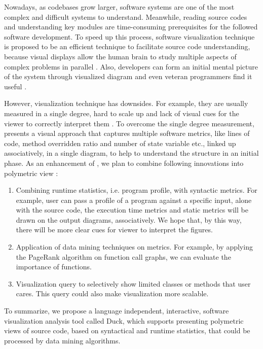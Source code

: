 \documentclass{sig-alternate}
\begin{document}
Nowadays, as codebases grow larger, software systems are one of the most complex and difficult systems to understand.
Meanwhile, reading source codes and understanding key modules are time-consuming prerequisites for the followed software development.
To speed up this process, software visualization technique is proposed to be an efficient technique
to facilitate source code understanding, because visual displays allow the human brain to study
multiple aspects of complex problems in parallel \cite{petre1995looking}.
Also, developers can form an initial mental picture of the system through visualized diagram \cite{lanza2003object}
and even veteran programmers find it useful \cite{kim2012field}. 

However, visualization technique has downsides.
For example, they are usually measured in a single degree,
hard to scale up and lack of visual cues for the viewer to correctly interpret them \cite{fenton2014software}.
To overcome the single degree measurement, \cite{lanza2003polymetric} presents a visual approach that captures multiple software metrics,
like lines of code, method overridden ratio and number of state variable etc.,
linked up associatively, in a single diagram,
to help to understand the structure in an initial phase.
As an enhancement of \cite{lanza2003polymetric}, we plan to combine following innovations into polymetric view \cite{lanza2003polymetric}:

\begin{enumerate}
  \item Combining runtime statistics, i.e. program profile, with syntactic metrics. For example, user can pass a profile of a program against a specific input, alone with the source code, the execution time metrics and static metrics will be drawn on the output diagrams, associatively. We hope that, by this way, there will be more clear cues for viewer to interpret the figures.
  \item Application of data mining techniques on metrics. For example, by applying the PageRank algorithm on function call graphs, we can evaluate the importance of functions.
  \item Visualization query to selectively show limited classes or methods that user cares. This query could also make visualization more scalable.
\end{enumerate}

To summarize, we propose a language independent, interactive, software visualization analysis tool called Duck, which supports presenting polymetric views of source code, based on syntactical and runtime statistics, that could be processed by data mining algorithms.
\end{document}
